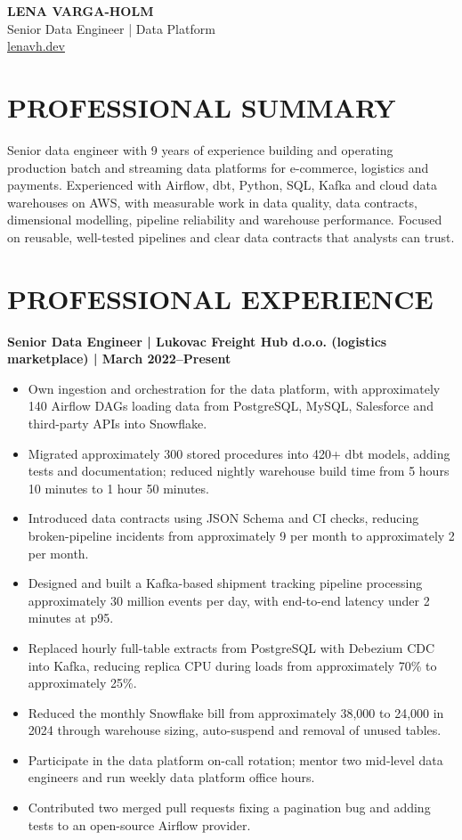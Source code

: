 \documentclass[11pt,a4paper]{article}
\begin{document}
\begin{center}
{\LARGE\bfseries\color{primarycolor} LENA VARGA-HOLM}\\
{\large\color{accentcolor} Senior Data Engineer | Data Platform}\\
\url{lenavh.dev}
\end{center}

\section*{PROFESSIONAL SUMMARY}
Senior data engineer with 9 years of experience building and operating production batch and streaming data platforms for e-commerce, logistics and payments. Experienced with Airflow, dbt, Python, SQL, Kafka and cloud data warehouses on AWS, with measurable work in data quality, data contracts, dimensional modelling, pipeline reliability and warehouse performance. Focused on reusable, well-tested pipelines and clear data contracts that analysts can trust.

\section*{PROFESSIONAL EXPERIENCE}
\textbf{Senior Data Engineer | Lukovac Freight Hub d.o.o. (logistics marketplace) | March 2022--Present}
\begin{itemize}
\item Own ingestion and orchestration for the data platform, with approximately 140 Airflow DAGs loading data from PostgreSQL, MySQL, Salesforce and third-party APIs into Snowflake.
\item Migrated approximately 300 stored procedures into 420+ dbt models, adding tests and documentation; reduced nightly warehouse build time from 5 hours 10 minutes to 1 hour 50 minutes.
\item Introduced data contracts using JSON Schema and CI checks, reducing broken-pipeline incidents from approximately 9 per month to approximately 2 per month.
\item Designed and built a Kafka-based shipment tracking pipeline processing approximately 30 million events per day, with end-to-end latency under 2 minutes at p95.
\item Replaced hourly full-table extracts from PostgreSQL with Debezium CDC into Kafka, reducing replica CPU during loads from approximately 70\% to approximately 25\%.
\item Reduced the monthly Snowflake bill from approximately 38,000 to 24,000 in 2024 through warehouse sizing, auto-suspend and removal of unused tables.
\item Participate in the data platform on-call rotation; mentor two mid-level data engineers and run weekly data platform office hours.
\item Contributed two merged pull requests fixing a pagination bug and adding tests to an open-source Airflow provider.
\end{itemize}
\end{document}
